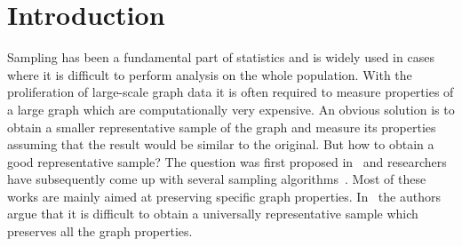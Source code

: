 
\section{Introduction}


Sampling has been a fundamental part of statistics and is widely used in cases where it is difficult to perform analysis on the whole population. With the proliferation of large-scale graph data it is often required to measure properties of a large graph which are computationally very expensive. An obvious solution is to obtain a smaller representative sample of the graph and measure its properties assuming that the result would be similar to the original. But how to obtain a good representative sample? The question was first proposed in~\cite{leskovec2006sampling} and researchers have subsequently come up with several sampling algorithms~\cite{ahmed2010reconsidering,maiya2010sampling,rasti2009respondent,ribeiro2010estimating}. Most of these works are mainly aimed at preserving specific graph properties. In~\cite{maiya2010sampling} the authors argue that it is difficult to obtain a universally representative sample which preserves all the graph properties. 

